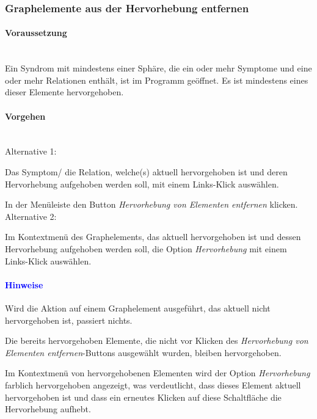 \documentclass[enabledeprecatedfontcommands,fontsize=11pt,paper=a4,twoside]{scrartcl}
\newcounter{one}
\newcounter{two}[one]
\newcommand*{\hint}{\paragraph{\textcolor{blue}{Hinweise}}}
\newcommand*{\condition}{\paragraph{Voraussetzung}$\;$ \vspace{0.2cm}\\}
\newcommand*{\actions}{\paragraph{Vorgehen} $\;$\vspace{0.2cm}\\}
\newcommand*{\aOne}{\textcolor{bbe}{Alternative 1:}}
\newcommand*{\aTwo}{\textcolor{bbe}{Alternative 2:}}
\let\tempone\itemize
\let\temptwo\enditemize
\renewenvironment{itemize}{\tempone\addtolength{\itemsep}{-10.0pt}}{\temptwo}
\let\origenumerate\enumerate
\let\origendenumerate\endenumerate
\renewenvironment{enumerate}{\origenumerate \addtolength{\itemsep}{-10.0pt}}{\origendenumerate}
\begin{document}
\subsubsection{Graphelemente aus der Hervorhebung entfernen}
		\condition 	
		Ein Syndrom mit mindestens einer Sphäre, die ein oder mehr Symptome und eine oder mehr Relationen enthält, ist im Programm geöffnet. Es ist mindestens eines dieser Elemente hervorgehoben.
		\actions
		\aOne
		\begin{enumerate}
			\item Das Symptom/ die Relation, welche(s) aktuell hervorgehoben ist und deren Hervorhebung aufgehoben werden soll, mit einem Links-Klick auswählen. 
			\item In der Menüleiste den Button \textit{Hervorhebung von Elementen entfernen} klicken.
		\end{enumerate}
		\aTwo
		\begin{enumerate}
			\item Im Kontextmenü des Graphelements, das aktuell hervorgehoben ist und dessen Hervorhebung aufgehoben werden soll, die Option \textit{Hervorhebung} mit einem Links-Klick auswählen.
		\end{enumerate}
		\hint
		\begin{itemize}
			\item Wird die Aktion auf einem Graphelement ausgeführt, das aktuell nicht hervorgehoben ist, passiert nichts.
			\item Die bereits hervorgehoben Elemente, die nicht vor Klicken des \textit{Hervorhebung von Elementen entfernen}-Buttons ausgewählt wurden, bleiben hervorgehoben.
			\item Im Kontextmenü von hervorgehobenen Elementen wird der Option \textit{Hervorhebung}  farblich hervorgehoben angezeigt, was verdeutlicht, dass dieses Element aktuell hervorgehoben ist und dass ein erneutes Klicken auf diese Schaltfläche die Hervorhebung aufhebt. \\
		\end{itemize}
	
\newpage
\end{document}
